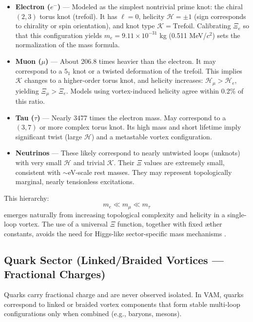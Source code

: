 \begin{itemize}
    \item \textbf{Electron ($e^-$)} — Modeled as the simplest nontrivial prime knot: the chiral $(2,3)$ torus knot (trefoil). It has $\ell = 0$, helicity $\mathcal{H} = \pm 1$ (sign corresponds to chirality or spin orientation), and knot type $\mathcal{K} = \text{Trefoil}$. Calibrating $\Xi_e$ so that this configuration yields $m_e = 9.11 \times 10^{-31}$ kg (0.511 MeV/$c^2$) sets the normalization of the mass formula.

    \item \textbf{Muon ($\mu$)} — About 206.8 times heavier than the electron. It may correspond to a $5_1$ knot or a twisted deformation of the trefoil. This implies $\mathcal{K}$ changes to a higher-order torus knot, and helicity increases: $\mathcal{H}_\mu > \mathcal{H}_e$, yielding $\Xi_\mu > \Xi_e$. Models using vortex-induced helicity agree within 0.2\% of this ratio.

    \item \textbf{Tau ($\tau$)} — Nearly 3477 times the electron mass. May correspond to a $(3,7)$ or more complex torus knot. Its high mass and short lifetime imply significant twist (large $\mathcal{H}$) and a metastable vortex configuration.

    \item \textbf{Neutrinos} — These likely correspond to nearly untwisted loops (unknots) with very small $\mathcal{H}$ and trivial $\mathcal{K}$. Their $\Xi$ values are extremely small, consistent with $\sim$eV-scale rest masses. They may represent topologically marginal, nearly tensionless excitations.
\end{itemize}

This hierarchy:
\[
    m_e \ll m_\mu \ll m_\tau
\]
emerges naturally from increasing topological complexity and helicity in a single-loop vortex. The use of a universal $\Xi$ function, together with fixed æther constants, avoids the need for Higgs-like sector-specific mass mechanisms \cite{Iskandarani2025f}.

    \subsection{Quark Sector (Linked/Braided Vortices — Fractional Charges)}

    Quarks carry fractional charge and are never observed isolated. In VAM, quarks correspond to linked or braided vortex components that form stable multi-loop configurations only when combined (e.g., baryons, mesons).

